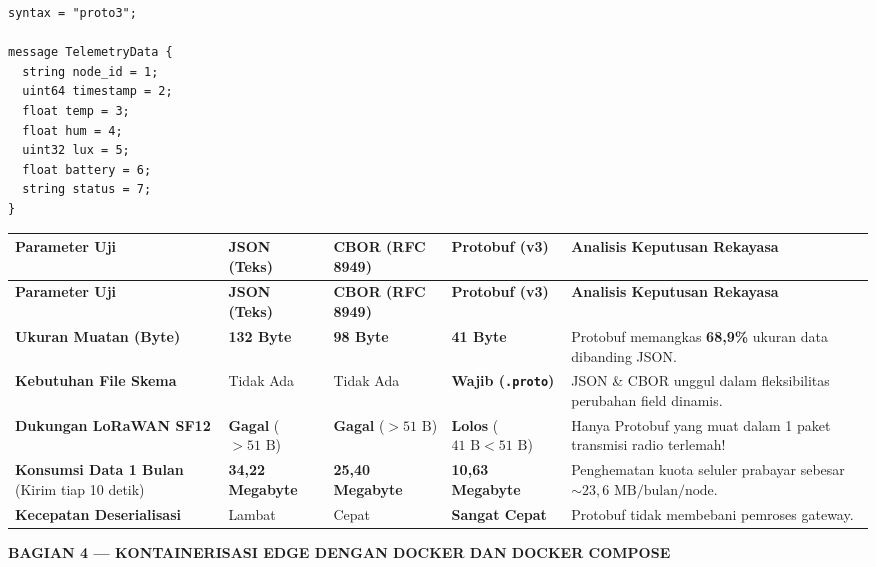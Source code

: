 \documentclass[11pt,a4paper]{article}
\newcommand{\secbanner}[2]{%
    \vspace{8pt}%
    \noindent\colorbox{unibnavy}{%
        \parbox{\dimexpr\textwidth-2\fboxsep\relax}{%
            \vspace{4pt}\textbf{\large\color{white}#1 --- #2}\vspace{4pt}%
        }%
    }%
    \vspace{4pt}%
}
\begin{document}
\begin{lstlisting}[style=iotcode, caption={Skema Protocol Buffers untuk Telemetri Lingkungan (telemetry.proto)}]
syntax = "proto3";

message TelemetryData {
  string node_id = 1;
  uint64 timestamp = 2;
  float temp = 3;
  float hum = 4;
  uint32 lux = 5;
  float battery = 6;
  string status = 7;
}
\end{lstlisting}

{\small
\begin{longtable}{|L{3.2cm}|C{2.6cm}|C{2.6cm}|C{2.6cm}|L{4.2cm}|}
\hline
{}
\textbf{Parameter Uji} & \textbf{JSON (Teks)} & \textbf{CBOR (RFC 8949)} & \textbf{Protobuf (v3)} & \textbf{Analisis Keputusan Rekayasa} \\
\hline
\endfirsthead
\hline
{}
\textbf{Parameter Uji} & \textbf{JSON (Teks)} & \textbf{CBOR (RFC 8949)} & \textbf{Protobuf (v3)} & \textbf{Analisis Keputusan Rekayasa} \\
\hline
\endhead
\textbf{Ukuran Muatan (Byte)} & \textbf{132 Byte} & \textbf{98 Byte} & \textbf{41 Byte} & Protobuf memangkas \textbf{68,9\%} ukuran data dibanding JSON. \\
\hline
\textbf{Kebutuhan File Skema} & Tidak Ada & Tidak Ada & \textbf{Wajib (\texttt{.proto})} & JSON \& CBOR unggul dalam fleksibilitas perubahan field dinamis. \\
\hline
\textbf{Dukungan LoRaWAN SF12} & \textbf{Gagal} ($>51\text{ B}$) & \textbf{Gagal} ($>51\text{ B}$) & \textbf{Lolos} ($41\text{ B} < 51\text{ B}$) & Hanya Protobuf yang muat dalam 1 paket transmisi radio terlemah! \\
\hline
\textbf{Konsumsi Data 1 Bulan} (Kirim tiap 10 detik) & \textbf{34,22 Megabyte} & \textbf{25,40 Megabyte} & \textbf{10,63 Megabyte} & Penghematan kuota seluler prabayar sebesar $\sim 23{,}6\text{ MB/bulan/node}$. \\
\hline
\textbf{Kecepatan Deserialisasi} & Lambat & Cepat & \textbf{Sangat Cepat} & Protobuf tidak membebani pemroses gateway. \\
\hline
\end{longtable}
}

\secbanner{BAGIAN 4}{KONTAINERISASI EDGE DENGAN DOCKER DAN DOCKER COMPOSE}
\end{document}
